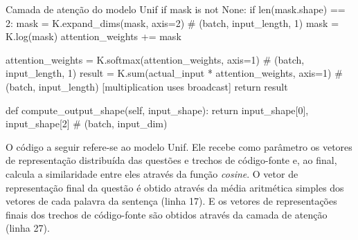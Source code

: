\begin{mypython-linenumber}{Camada de atenção do modelo Unif}
        if mask is not None:
            if len(mask.shape) == 2:
                mask = K.expand_dims(mask, axis=2)  # (batch, input_length, 1)
            mask = K.log(mask)
            attention_weights += mask

        attention_weights = K.softmax(attention_weights, axis=1)  # (batch, input_length, 1)
        result = K.sum(actual_input * attention_weights, axis=1)  # (batch, input_length)  [multiplication uses broadcast]
        return result

    def compute_output_shape(self, input_shape):
        return input_shape[0], input_shape[2] # (batch, input_dim)
\end{mypython-linenumber}


\vspace{2cm}

O código a seguir refere-se ao modelo Unif. Ele recebe como parâmetro os vetores de representação distribuída das questões e trechos de código-fonte e, ao final, calcula a similaridade entre eles através da função \textit{cosine}. O vetor de representação final da questão é obtido através da média aritmética simples dos vetores de cada palavra da sentença (linha 17). E os vetores de representações finais dos trechos de código-fonte são obtidos através da camada de atenção (linha 27).


